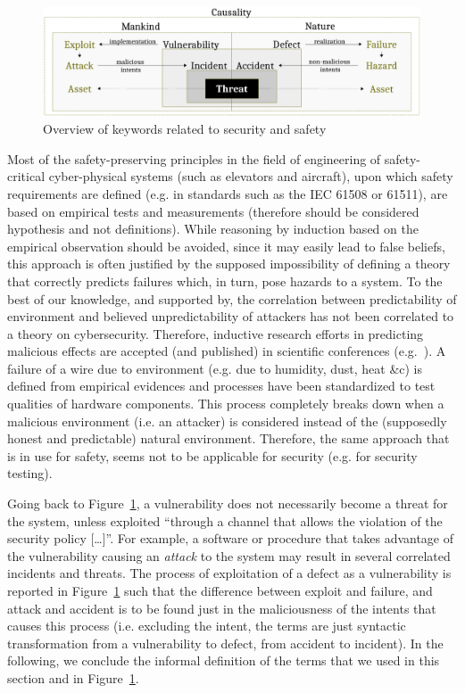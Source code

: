 \begin{figure}[t]
	\centering
	\includegraphics[width=\textwidth]{safety-security.pdf}
	\caption{Overview of keywords related to security and safety}
	\label{fig:safety-security}
\end{figure}

Most of the safety-preserving principles in the field of engineering of
safety-critical cyber-physical systems (such as elevators and aircraft), upon
which safety requirements are defined (e.g. in standards such as the IEC 61508 or 61511\autocite{IEC201761511}), 
are based on empirical tests and measurements (therefore should be considered hypothesis and not definitions). While reasoning by
induction based on the empirical observation should be avoided, since it may
easily lead to false beliefs, this approach is
often justified by the supposed impossibility of defining a theory that
correctly predicts failures which, in turn, pose hazards to a system. 
To the best of our knowledge, and supported by\autocite{Herley2016unfalsifiability}, the
correlation between predictability of environment and believed unpredictability
of attackers has not been correlated to a theory on cybersecurity. 
Therefore, inductive research efforts in
predicting malicious effects are accepted (and published) in scientific
conferences (e.g.~\autocite{Rocchetto2014CSRF}). A failure of a wire due to
environment (e.g. due to humidity, dust, heat \&c) is defined from empirical
evidences and processes have been standardized to test qualities of hardware components.
This process completely breaks down when a malicious environment (i.e. an attacker)
is considered instead of the (supposedly honest and predictable)
natural environment. Therefore, the same approach that is in use for safety,
seems not to be applicable for security (e.g. for security testing).

Going back to Figure~\ref{fig:safety-security}, a vulnerability does not
necessarily become a threat for the system, unless exploited ``through a
channel that allows the violation of the security policy
[\ldots]''\autocite{cnssi20104009}. For example, a software or procedure that takes
advantage of the vulnerability causing an \emph{attack} to the system may
result in several correlated incidents and threats.  The process of
exploitation of a defect as a vulnerability is reported in
Figure~\ref{fig:safety-security} such that the difference between exploit and failure,
and attack and accident is to be found just in the maliciousness of the intents
that causes this process (i.e. excluding the intent, the terms are just syntactic transformation from a vulnerability to defect, from
accident to incident). In the following, we conclude the informal definition of
the terms that we used in this section and in Figure~\ref{fig:safety-security}.

